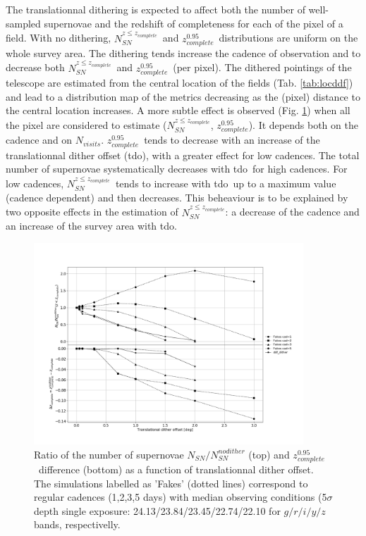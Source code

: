 \documentclass[\docopts]{\docclass}
\newcommand{\nsncomp}{{$N_{SN}^{z\leq z_{complete}}$}}
\newcommand{\zcompb}{\mbox{$z_{complete}^{0.95}$}}
\newcommand{\nvisits}{$N_{visits}$}
\newcommand{\doffset}{tdo}
\begin{document}
\par
The translationnal dithering is expected to affect both the number of well-sampled supernovae and the redshift of completeness for each of the pixel of a field. With no dithering, \nsncomp~and \zcompb~distributions are uniform on the whole survey area. The dithering tends increase the cadence of observation and to decrease both \nsncomp~and \zcompb~(per pixel). The dithered pointings of the telescope are estimated from the central location of the fields (Tab. \ref{tab:locddf}) and lead to a distribution map of the metrics decreasing as the (pixel) distance to the central location increases. A more subtle effect is observed (Fig. \ref{fig:dither}) when all the pixel are considered to estimate (\nsncomp, \zcompb). It depends both on the cadence and on \nvisits. \zcompb~tends to decrease with an increase of the translationnal dither offset (\doffset), with a greater effect for low cadences. The total number of supernovae systematically decreases with \doffset~for high cadences. For low cadences, \nsncomp~tends to increase with \doffset~up to a maximum value (cadence dependent) and then decreases. This beheaviour is to be explained by two opposite effects in the estimation of \nsncomp: a decrease of the cadence and an increase of the survey area with \doffset.

\begin{figure}[htbp]
  \begin{center}
  \includegraphics[width=0.9\textwidth]{dither_ddf.png}
 \caption{Ratio of the number of supernovae $N_{SN}/N_{SN}^{nodither}$ (top) and \zcompb~difference (bottom) as a function of translationnal dither offset. The simulations labelled as 'Fakes' (dotted lines) correspond to regular cadences (1,2,3,5 days) with median observing conditions (5$\sigma$ depth single exposure: 24.13/23.84/23.45/22.74/22.10 for $g/r/i/y/z$ bands, respectivelly.}\label{fig:dither}
\end{center}
\end{figure}
\end{document}
